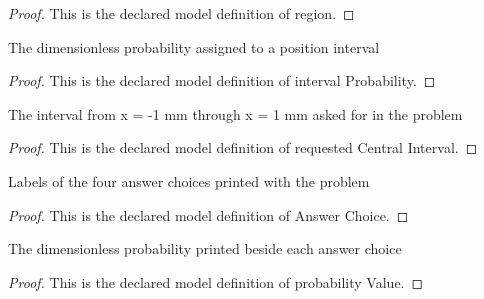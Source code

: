 \begin{proof}
  This is the declared model definition of region.
\end{proof}
\begin{definition}
  \label{def:physics:phyx-mini-0648:phyxminiproblems-problemphyxmini0648-intervalprobability}
  The dimensionless probability assigned to a position interval
\end{definition}
\begin{proof}
  This is the declared model definition of interval Probability.
\end{proof}
\begin{definition}
  \label{def:physics:phyx-mini-0648:phyxminiproblems-problemphyxmini0648-requestedcentralinterval}
  The interval from x = -1 mm through x = 1 mm asked for in the problem
\end{definition}
\begin{proof}
  This is the declared model definition of requested Central Interval.
\end{proof}
\begin{definition}
  \label{def:physics:phyx-mini-0648:phyxminiproblems-problemphyxmini0648-answerchoice}
  Labels of the four answer choices printed with the problem
\end{definition}
\begin{proof}
  This is the declared model definition of Answer Choice.
\end{proof}
\begin{definition}
  \label{def:physics:phyx-mini-0648:phyxminiproblems-problemphyxmini0648-answerchoice-probabilityvalue}
  The dimensionless probability printed beside each answer choice
\end{definition}
\begin{proof}
  This is the declared model definition of probability Value.
\end{proof}
